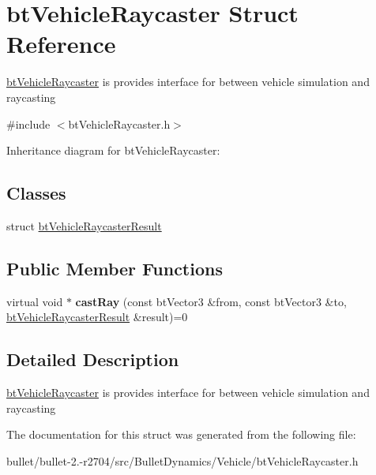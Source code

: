 \hypertarget{structbt_vehicle_raycaster}{\section{bt\+Vehicle\+Raycaster Struct Reference}
\label{structbt_vehicle_raycaster}
}


\hyperlink{structbt_vehicle_raycaster}{bt\+Vehicle\+Raycaster} is provides interface for between vehicle simulation and raycasting  




{\ttfamily \#include $<$bt\+Vehicle\+Raycaster.\+h$>$}



Inheritance diagram for bt\+Vehicle\+Raycaster\+:
\subsection*{Classes}
\begin{DoxyCompactItemize}
\item 
struct \hyperlink{structbt_vehicle_raycaster_1_1bt_vehicle_raycaster_result}{bt\+Vehicle\+Raycaster\+Result}
\end{DoxyCompactItemize}
\subsection*{Public Member Functions}
\begin{DoxyCompactItemize}
\item 
\hypertarget{structbt_vehicle_raycaster_a48bcd58b09c3c72a0a548d757318a373}{virtual void $\ast$ {\bfseries cast\+Ray} (const bt\+Vector3 \&from, const bt\+Vector3 \&to, \hyperlink{structbt_vehicle_raycaster_1_1bt_vehicle_raycaster_result}{bt\+Vehicle\+Raycaster\+Result} \&result)=0}\label{structbt_vehicle_raycaster_a48bcd58b09c3c72a0a548d757318a373}

\end{DoxyCompactItemize}


\subsection{Detailed Description}
\hyperlink{structbt_vehicle_raycaster}{bt\+Vehicle\+Raycaster} is provides interface for between vehicle simulation and raycasting 

The documentation for this struct was generated from the following file\+:\begin{DoxyCompactItemize}
\item 
bullet/bullet-\/2.-\/r2704/src/\+Bullet\+Dynamics/\+Vehicle/bt\+Vehicle\+Raycaster.\+h\end{DoxyCompactItemize}
